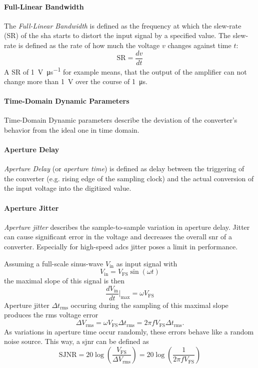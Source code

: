 \paragraph{Full-Linear Bandwidth}
The \textit{Full-Linear Bandwidth} is defined as the frequency at which the slew-rate (SR) of the \gls{sha} starts to distort the input signal by a specified value. \cite{Lundberg} The slew-rate is defined as the rate of how much the voltage $v$ changes against time $t$:
\begin{equation}
	\text{SR} = \frac{dv}{dt}
\end{equation}
A SR of \SI{1}{\volt \per \micro \second} for example means, that the output of the amplifier can not change more than \SI{1}{\volt} over the course of \SI{1}{\micro \second}.\cite{2021Slew} 

\paragraph{Time-Domain Dynamic Parameters}
Time-Domain Dynamic parameters describe the deviation of the converter's behavior from the ideal one in time domain. 
\paragraph{Aperture Delay}
\textit{Aperture Delay} (or \textit{aperture time}) is defined as delay between the triggering of the converter (e.g. rising edge of the sampling clock) and the actual conversion of the input voltage into the digitized value. \cite{Lundberg}
\paragraph{Aperture Jitter}
\textit{Aperture jitter} describes the sample-to-sample variation in aperture delay. Jitter can cause significant error in the voltage and decreases the overall \gls{snr} of a converter. Especially for high-speed \glspl{adc} jitter poses a limit in performance.

Assuming a full-scale sinus-wave $V_{\text{in}}$ as input signal with 
\begin{equation}
	V_{\text{in}} = V_{\text{FS}} \sin (\omega t)
\end{equation}
the maximal slope of this signal is then
\begin{equation}
	\frac{dV_{\text{in}}}{dt}\Bigr|_{\text{max}} = \omega V_{\text{FS}}
\end{equation}
Aperture jitter $\Delta t_{\text{rms}}$ occuring during the sampling of this maximal slope produces the \gls{rms} voltage error 
\begin{equation}
	\Delta V_{\text{rms}} = \omega  V_{\text{FS}} \Delta t_{\text{rms}} = 2 \pi f  V_{\text{FS}} \Delta t_{\text{rms}}.
\end{equation}
As variations in aperture time occur randomly, these errors behave like a random noise source. This way, a \gls{sjnr} can be defined as
\begin{equation}
	\text{SJNR} = 20 \log \left( \frac{V_{\text{FS}}}{\Delta V_{\text{rms}}} \right) = 20 \log \left( \frac{1}{2 \pi f  V_{\text{FS}}} \right)
\end{equation}

